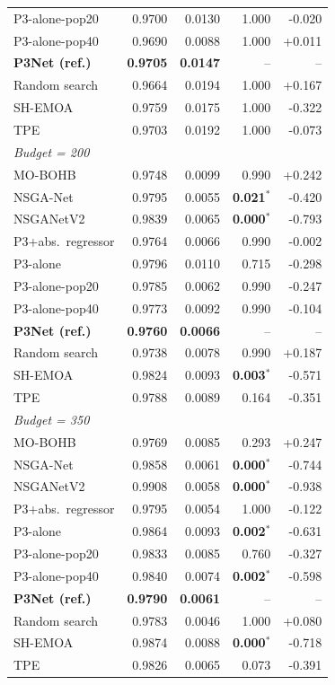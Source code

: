 \begin{table}[t]
\begin{tabular}{@{}lrrrr@{}}
        P3-alone-pop20 & 0.9700 & 0.0130 & 1.000 & -0.020 \\
        P3-alone-pop40 & 0.9690 & 0.0088 & 1.000 & +0.011 \\
        \textbf{P3Net (ref.)} & \textbf{0.9705} & \textbf{0.0147} & -- & -- \\
        Random search & 0.9664 & 0.0194 & 1.000 & +0.167 \\
        SH-EMOA & 0.9759 & 0.0175 & 1.000 & -0.322 \\
        TPE & 0.9703 & 0.0192 & 1.000 & -0.073 \\
        \midrule
        \multicolumn{5}{l}{\emph{Budget = 200}} \\
        MO-BOHB & 0.9748 & 0.0099 & 0.990 & +0.242 \\
        NSGA-Net & 0.9795 & 0.0055 & \textbf{0.021$^{*}$} & -0.420 \\
        NSGANetV2 & 0.9839 & 0.0065 & \textbf{0.000$^{*}$} & -0.793 \\
        P3+abs.\ regressor & 0.9764 & 0.0066 & 0.990 & -0.002 \\
        P3-alone & 0.9796 & 0.0110 & 0.715 & -0.298 \\
        P3-alone-pop20 & 0.9785 & 0.0062 & 0.990 & -0.247 \\
        P3-alone-pop40 & 0.9773 & 0.0092 & 0.990 & -0.104 \\
        \textbf{P3Net (ref.)} & \textbf{0.9760} & \textbf{0.0066} & -- & -- \\
        Random search & 0.9738 & 0.0078 & 0.990 & +0.187 \\
        SH-EMOA & 0.9824 & 0.0093 & \textbf{0.003$^{*}$} & -0.571 \\
        TPE & 0.9788 & 0.0089 & 0.164 & -0.351 \\
        \midrule
        \multicolumn{5}{l}{\emph{Budget = 350}} \\
        MO-BOHB & 0.9769 & 0.0085 & 0.293 & +0.247 \\
        NSGA-Net & 0.9858 & 0.0061 & \textbf{0.000$^{*}$} & -0.744 \\
        NSGANetV2 & 0.9908 & 0.0058 & \textbf{0.000$^{*}$} & -0.938 \\
        P3+abs.\ regressor & 0.9795 & 0.0054 & 1.000 & -0.122 \\
        P3-alone & 0.9864 & 0.0093 & \textbf{0.002$^{*}$} & -0.631 \\
        P3-alone-pop20 & 0.9833 & 0.0085 & 0.760 & -0.327 \\
        P3-alone-pop40 & 0.9840 & 0.0074 & \textbf{0.002$^{*}$} & -0.598 \\
        \textbf{P3Net (ref.)} & \textbf{0.9790} & \textbf{0.0061} & -- & -- \\
        Random search & 0.9783 & 0.0046 & 1.000 & +0.080 \\
        SH-EMOA & 0.9874 & 0.0088 & \textbf{0.000$^{*}$} & -0.718 \\
        TPE & 0.9826 & 0.0065 & 0.073 & -0.391 \\
        \bottomrule
    \end{tabular}
\end{table}

